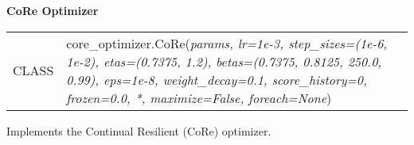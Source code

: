 \documentclass[11pt,a4paper]{article}
\begin{document}
\begin{Large}\textbf{CoRe Optimizer}\end{Large}

\vspace*{0.8cm}
\hspace*{-0.2cm}\begin{tabular}{p{0.075\linewidth}p{0.925\linewidth}}
    CLASS & core{\_}optimizer.CoRe(\textit{params, lr=1e-3, step{\_}sizes=(1e-6, 1e-2), etas=(0.7375, 1.2), betas=(0.7375, 0.8125, 250.0, 0.99), eps=1e-8, weight{\_}decay=0.1, score{\_}history=0, frozen=0.0, *, maximize=False, foreach=None})\\
\end{tabular}
\vspace*{0.4cm}

Implements the Continual Resilient (CoRe) optimizer.
\end{document}
